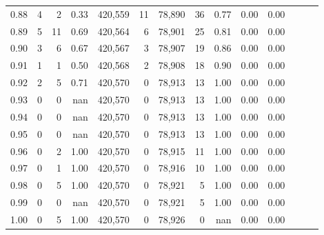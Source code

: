 \begin{tabular}{rrrrrrrrrrrrrr}
0.88 &       4 &      2 &  0.33 &  420,559 &       11 &  78,890 &      36 &  0.77 &  0.00 &      0.00 \\
0.89 &       5 &     11 &  0.69 &  420,564 &        6 &  78,901 &      25 &  0.81 &  0.00 &      0.00 \\
0.90 &       3 &      6 &  0.67 &  420,567 &        3 &  78,907 &      19 &  0.86 &  0.00 &      0.00 \\
0.91 &       1 &      1 &  0.50 &  420,568 &        2 &  78,908 &      18 &  0.90 &  0.00 &      0.00 \\
0.92 &       2 &      5 &  0.71 &  420,570 &        0 &  78,913 &      13 &  1.00 &  0.00 &      0.00 \\
0.93 &       0 &      0 &   nan &  420,570 &        0 &  78,913 &      13 &  1.00 &  0.00 &      0.00 \\
0.94 &       0 &      0 &   nan &  420,570 &        0 &  78,913 &      13 &  1.00 &  0.00 &      0.00 \\
0.95 &       0 &      0 &   nan &  420,570 &        0 &  78,913 &      13 &  1.00 &  0.00 &      0.00 \\
0.96 &       0 &      2 &  1.00 &  420,570 &        0 &  78,915 &      11 &  1.00 &  0.00 &      0.00 \\
0.97 &       0 &      1 &  1.00 &  420,570 &        0 &  78,916 &      10 &  1.00 &  0.00 &      0.00 \\
0.98 &       0 &      5 &  1.00 &  420,570 &        0 &  78,921 &       5 &  1.00 &  0.00 &      0.00 \\
0.99 &       0 &      0 &   nan &  420,570 &        0 &  78,921 &       5 &  1.00 &  0.00 &      0.00 \\
1.00 &       0 &      5 &  1.00 &  420,570 &        0 &  78,926 &       0 &   nan &  0.00 &      0.00 \\
\bottomrule
\end{tabular}
